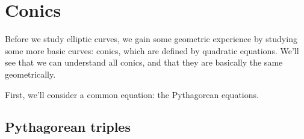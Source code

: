 \chapter{Conics}

Before we study elliptic curves, we gain some geometric experience by studying some more basic curves: conics, which are defined by quadratic equations. We'll see that we can understand all conics, and that they are basically the same geometrically.

First, we'll consider a common equation: the Pythagorean equations.

\section{Pythagorean triples}




